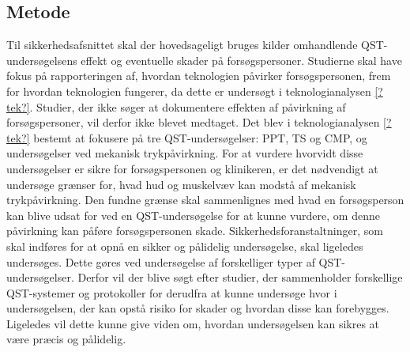 \subsection{Metode}
Til sikkerhedsafsnittet skal der hovedsageligt bruges kilder omhandlende QST-undersøgelsens effekt og eventuelle skader på forsøgspersoner. Studierne skal have fokus på rapporteringen af, hvordan teknologien påvirker forsøgspersonen, frem for hvordan teknologien fungerer, da dette er undersøgt i teknologianalysen \ref{?tek?}. Studier, der ikke søger at dokumentere effekten af påvirkning af forsøgspersoner, vil derfor ikke blevet medtaget. Det blev i teknologianalysen \ref{?tek?} bestemt at fokusere på tre QST-undersøgelser: PPT, TS og CMP, og undersøgelser ved mekanisk trykpåvirkning. For at vurdere hvorvidt disse undersøgelser er sikre for forsøgspersonen og klinikeren, er det nødvendigt at undersøge grænser for, hvad hud og muskelvæv kan modstå af mekanisk trykpåvirkning. Den fundne grænse skal sammenlignes med hvad en forsøgsperson kan blive udsat for ved en QST-undersøgelse for at kunne vurdere, om denne påvirkning kan påføre forsøgspersonen skade. Sikkerhedsforanstaltninger, som skal indføres for at opnå en sikker og pålidelig undersøgelse, skal ligeledes undersøges. Dette gøres ved undersøgelse af forskelliger typer af QST-undersøgelser. Derfor vil der blive søgt efter studier, der sammenholder forskellige QST-systemer og protokoller for derudfra at kunne undersøge hvor i undersøgelsen, der kan opstå risiko for skader og hvordan disse kan forebygges. Ligeledes vil dette kunne give viden om, hvordan undersøgelsen kan sikres at være præcis og pålidelig.


